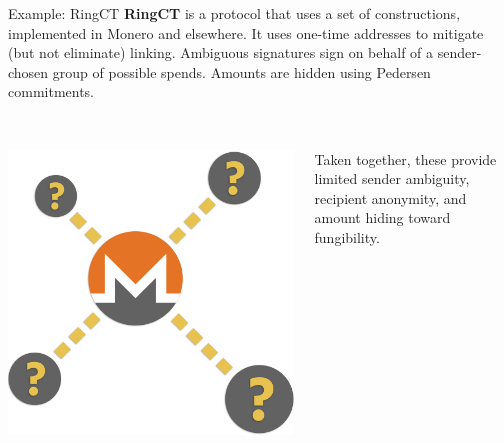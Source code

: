 \documentclass[aspectratio=169]{beamer}
\begin{document}
\begin{frame}{Example: RingCT}
\textbf{RingCT} is a protocol that uses a set of constructions, implemented in Monero and elsewhere. It uses one-time addresses to mitigate (but not eliminate) linking. Ambiguous signatures sign on behalf of a sender-chosen group of possible spends. Amounts are hidden using Pedersen commitments. \\~\\

\begin{columns}
\begin{column}{0.2\textwidth}
\includegraphics[width=\textwidth]{ambiguous.png}
\end{column}
\begin{column}{0.8\textwidth}
Taken together, these provide limited sender ambiguity, recipient anonymity, and amount hiding toward fungibility.
\end{column}
\end{columns}
\end{frame}
\end{document}
